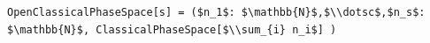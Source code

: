 \documentclass[border=10pt]{standalone}
\begin{document}
\begin{lstlisting}
OpenClassicalPhaseSpace[s] = ($n_1$: $\mathbb{N}$,$\\dotsc$,$n_s$: $\mathbb{N}$, ClassicalPhaseSpace[$\\sum_{i} n_i$] )
\end{lstlisting}
\end{document}
